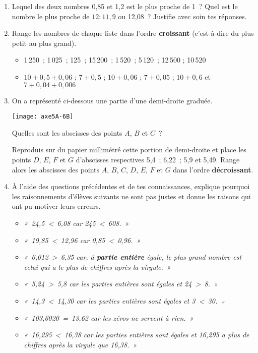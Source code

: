 \begin{activite}

\begin{partie}
\begin{enumerate}
 \item Lequel des deux nombres 0,85 et 1,2 est le plus proche de 1 ? Quel est le nombre le plus proche de $12 : 11,9$ ou 12,08 ? Justifie avec soin tes réponses.
 \item Range les nombres de chaque liste dans l'ordre \textbf{croissant} (c'est-à-dire du plus petit au plus grand).
 	\begin{itemize}
	\item 1\,250 ; 1\,025 ; 125 ; 15\,200 ; 1\,520 ; 5\,120 ; 12\,500 ; 10\,520
	\item $10 + 0,5 + 0,06$ ; $7 + 0,5$ ; $10 + 0,06$ ; $7 + 0,05$ ; $10 + 0,6$ et $7 + 0,04 + 0,006$
	 \end{itemize}
 \item On a représenté ci-dessous une partie d'une demi-droite graduée.
 
 \texttt{[image: axe5A-6B]}

Quelles sont les abscisses des points $A$, $B$ et $C$ ?

\vspace{0.75em}

Reproduis sur du papier millimétré cette portion de demi-droite et place les points $D$, $E$, $F$ et $G$ d'abscisses respectives 5,4 ; 6,22 ; 5,9 et 5,49.
Range alors les abscisses des points $A$, $B$, $C$, $D$, $E$, $F$ et $G$ dans l'ordre \textbf{décroissant}.
 \item À l'aide des questions précédentes et de tes connaissances, explique pourquoi les raisonnements d'élèves suivants ne sont pas justes et donne les raisons qui ont pu motiver leurs erreurs.
	\begin{itemize}
	\item \emph{« 24,5 < 6,08 car 245 < 608. »}
	\item \emph{« 19,85 < 12,96 car 0,85 < 0,96. »}
	\item \emph{« 6,012 > 6,35 car, à \textbf{partie entière} égale, le plus grand nombre est celui qui a le plus de chiffres après la virgule. »}
	\item \emph{« 5,24 > 5,8 car les parties entières sont égales et 24 > 8. »}
	\item \emph{« 14,3 < 14,30 car les parties entières sont égales et 3 < 30. »}
	\item \emph{« 103,6020 = 13,62 car les zéros ne servent à rien. »}
	\item \emph{« 16,295 < 16,38 car les parties entières sont égales et 16,295 a plus de chiffres après la virgule que 16,38. »}
	 \end{itemize}
 \end{enumerate}
\end{partie}


\end{activite}
